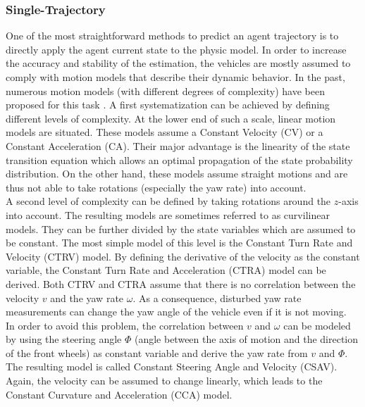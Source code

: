 \subsubsection{Single-Trajectory}
\label{subsubsec:2_single_trajectory_mp}

One of the most straightforward methods to predict an agent trajectory is to directly apply the agent current state to the physic model. In order to increase the accuracy and stability of the estimation, the vehicles are mostly assumed to comply with motion models that describe their dynamic behavior. In the past, numerous motion models (with different degrees of complexity) have been proposed for this task \cite{miller2002adaptive, pepy2006reducing, hillenbrand2006multilevel}. A first systematization can be achieved by defining different levels of complexity. At the lower end of such a scale, linear motion models are situated. These models assume a Constant Velocity (CV) or a Constant Acceleration (CA). Their major advantage is the linearity of the state transition equation which allows an optimal propagation of the state probability distribution. On the other hand, these models assume straight motions and are thus not able to take rotations (especially the yaw rate) into account. \\

A second level of complexity can be defined by taking rotations around the $z$-axis into account. The resulting models are sometimes referred to as curvilinear models. They can be further divided by the state variables which are assumed to be constant. The most simple model of this level is the Constant Turn Rate and Velocity (CTRV) model. By defining the derivative of the velocity as the constant variable, the Constant Turn Rate and Acceleration (CTRA) model can be derived. Both CTRV and CTRA assume that there is no correlation between the velocity $v$ and the yaw rate $\omega$. As a consequence, disturbed yaw rate measurements can change the yaw angle of the vehicle even if it is not moving. \\

In order to avoid this problem, the correlation between $v$ and $\omega$ can be modeled by using the steering angle $\Phi$ (angle between the axis of motion and the direction of the front wheels) as constant variable and derive the yaw rate from $v$ and $\Phi$. The resulting model is called Constant Steering Angle and Velocity (CSAV). Again, the velocity can be assumed to change linearly, which leads to the Constant Curvature and Acceleration (CCA) model. \\

